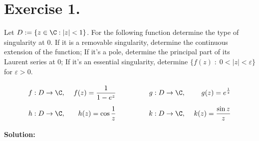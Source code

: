 \section*{Exercise 1.}

Let $D := \{ z \in \C : |z| < 1\}$. For the following function determine the type of singularity at 0. If it is a removable singularity, determine the continuous extension of the function; If it's a pole, determine the principal part of its Laurent series at 0; If it's an essential singularity, determine $\{f(z) \;:\; 0<|z| < \varepsilon\}$ for $\varepsilon > 0$.
\[ \everymath{\displaystyle}
\arraycolsep=1.8pt\def\arraystretch{2.5}
\begin{array}{rrcrr}
    f : D \to \C,\hspace{1em} & f(z) = \frac{1}{1-e^z} & \hspace{4em} & g : D \to \C,\hspace{1em} & g(z) = e^{\frac{1}{z}}\\
    h : D \to \C,\hspace{1em} & h(z) = \cos\frac{1}{z} & \hspace{4em} & k : D \to \C,\hspace{1em} & k(z) = \frac{\sin z}{z}
\end{array}
\]

\textbf{Solution:}



